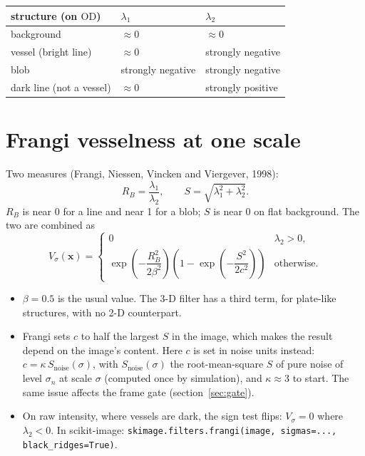 \documentclass[11pt]{article}
\newcommand{\x}{\mathbf{x}}
\newcommand{\OD}{\mathrm{OD}}
\begin{document}
\begin{center}
\begin{tabular}{@{}lll@{}}
\toprule
structure (on $\OD$) & $\lambda_1$ & $\lambda_2$ \\
\midrule
background & $\approx 0$ & $\approx 0$ \\
vessel (bright line) & $\approx 0$ & strongly negative \\
blob & strongly negative & strongly negative \\
dark line (not a vessel) & $\approx 0$ & strongly positive \\
\bottomrule
\end{tabular}
\end{center}

\section{Frangi vesselness at one scale}\label{sec:frangi}

Two measures (Frangi, Niessen, Vincken and Viergever, 1998):
\begin{equation}
  R_B = \frac{\lambda_1}{\lambda_2},
  \qquad
  S = \sqrt{\lambda_1^2 + \lambda_2^2}.
\end{equation}
$R_B$ is near 0 for a line and near 1 for a blob; $S$ is near 0 on flat background. The two are combined as
\begin{equation}
  V_\sigma(\x) =
  \begin{cases}
    0 & \lambda_2 > 0, \\[2pt]
    \exp\!\left(-\dfrac{R_B^2}{2\beta^2}\right)\left(1 - \exp\!\left(-\dfrac{S^2}{2c^2}\right)\right) & \text{otherwise.}
  \end{cases}
  \label{eq:frangi}
\end{equation}
\begin{itemize}
  \item $\beta = 0.5$ is the usual value. The 3-D filter has a third term, for plate-like structures, with no 2-D
        counterpart.
  \item Frangi sets $c$ to half the largest $S$ in the image, which makes the result depend on the image's
        content. Here $c$ is set in noise units instead: $c = \kappa\, S_\mathrm{noise}(\sigma)$, with
        $S_\mathrm{noise}(\sigma)$ the root-mean-square $S$ of pure noise of level $\sigma_n$ at scale $\sigma$
        (computed once by simulation), and $\kappa \approx 3$ to start. The same issue affects the frame gate (section~\ref{sec:gate}).
  \item On raw intensity, where vessels are dark, the sign test flips: $V_\sigma = 0$ where $\lambda_2 < 0$. In
        scikit-image: \texttt{skimage.filters.frangi(image, sigmas=..., black\_ridges=True)}.
\end{itemize}
\end{document}
